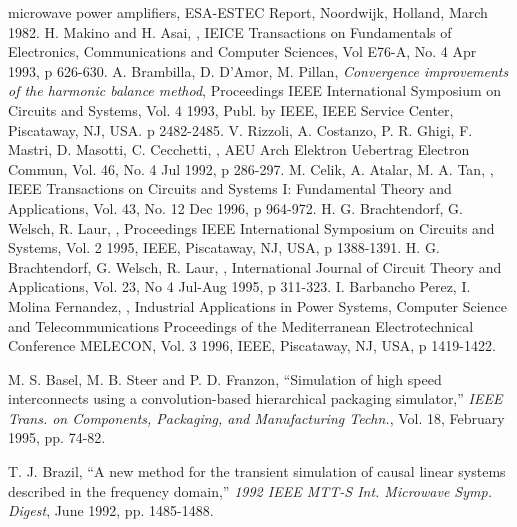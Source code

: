 \begin{thebibliography}{99}
{microwave power amplifiers}, \newblock ESA-ESTEC Report, Noordwijk,
Holland, March 1982.
%
H. Makino and H. Asai, , \newblock IEICE Transactions on Fundamentals of Electronics,
Communications and Computer Sciences, Vol E76-A, No. 4 Apr 1993, p
626-630.
%
A. Brambilla, D. D'Amor, M. Pillan, \newblock
{\em Convergence improvements of the harmonic balance method},
\newblock Proceedings IEEE International Symposium on Circuits and
Systems, Vol. 4 1993, Publ. by IEEE, IEEE Service Center, Piscataway,
NJ, USA. p 2482-2485.
%
V. Rizzoli, A. Costanzo, P. R. Ghigi,
F. Mastri, D. Masotti, C. Cecchetti, , \newblock AEU Arch Elektron Uebertrag Electron Commun,
Vol. 46, No. 4 Jul 1992, p 286-297.
%
M. Celik, A. Atalar, M. A. Tan, , \newblock IEEE Transactions on Circuits and Systems I:
Fundamental Theory and Applications, Vol. 43, No. 12 Dec 1996, p
964-972.
%
H. G. Brachtendorf, G. Welsch, R. Laur,
, \newblock Proceedings IEEE International
Symposium on Circuits and Systems, Vol. 2 1995, IEEE, Piscataway, NJ,
USA, p 1388-1391.
%
H. G. Brachtendorf, G. Welsch, R. Laur,
, \newblock International Journal
of Circuit Theory and Applications, Vol. 23, No 4 Jul-Aug 1995, p
311-323.
%
I. Barbancho Perez, I. Molina Fernandez,
, \newblock Industrial Applications in
Power Systems, Computer Science and Telecommunications Proceedings of
the Mediterranean Electrotechnical Conference MELECON, Vol. 3 1996,
IEEE, Piscataway, NJ, USA, p 1419-1422.
%

 M. S. Basel, M. B. Steer and P. D. Franzon,
``Simulation of high speed interconnects using a convolution-based
hierarchical packaging simulator,'' \emph{IEEE Trans. on
Components, Packaging, and Manufacturing Techn.}, Vol. 18, February
1995, pp. 74-82.

 T. J. Brazil, ``A new method for the transient
simulation of causal linear systems described in the frequency
domain,'' \emph{1992 IEEE MTT-S Int. Microwave Symp. Digest}, June
1992, pp. 1485-1488.


\end{thebibliography}
